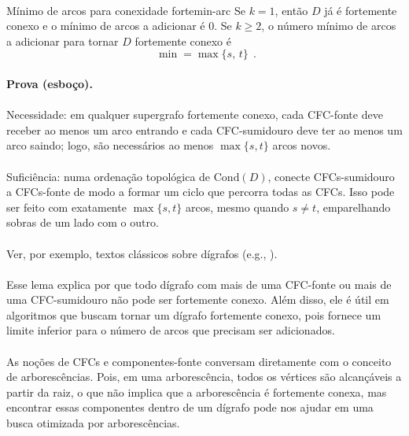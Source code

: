 \documentclass[12pt,a4paper]{article}
\def\emph#1{#1}%
\begin{document}
\paragraph{}
\begin{lemabox}{Mínimo de arcos para conexidade forte}{min-arc}
Se $k=1$, então $D$ já é fortemente conexo e o mínimo de arcos a adicionar é $0$. Se $k\ge 2$, o número mínimo de arcos a adicionar para tornar $D$ fortemente conexo é \[\boxed{\;\min = \max\{s,\,t\}\;}\,.\]

\paragraph{}
	\textbf{Prova (esboço).} 
    \paragraph{}
    \emph{Necessidade:} em qualquer supergrafo fortemente conexo, cada CFC-fonte deve receber ao menos um arco \emph{entrando} e cada CFC-sumidouro deve ter ao menos um arco \emph{saindo}; logo, são necessários ao menos $\max\{s,t\}$ arcos novos. 
    
    \paragraph{}
    \emph{Suficiência:} numa ordenação topológica de $\mathrm{Cond}(D)$, conecte CFCs-sumidouro a CFCs-fonte de modo a formar um ciclo que percorra todas as CFCs. Isso pode ser feito com exatamente $\max\{s,t\}$ arcos, mesmo quando $s\ne t$, emparelhando sobras de um lado com o outro. 
    
    \paragraph{}
    Ver, por exemplo, textos clássicos sobre dígrafos (e.g., \cite{schrijver2003comb}).
\end{lemabox}

\paragraph{}
Esse lema explica por que todo dígrafo com mais de uma CFC-fonte ou mais de uma CFC-sumidouro não pode ser fortemente conexo. Além disso, ele é útil em algoritmos que buscam tornar um dígrafo fortemente conexo, pois fornece um limite inferior para o número de arcos que precisam ser adicionados.

\paragraph{}
As noções de CFCs e componentes-fonte conversam diretamente com o conceito de \emph{arborescências}. Pois, em uma arborescência, todos os vértices são alcançáveis a partir da raiz, o que não implica que a arborescência é fortemente conexa, mas encontrar essas componentes dentro de um dígrafo pode nos ajudar em uma busca otimizada por arborescências.
\end{document}
